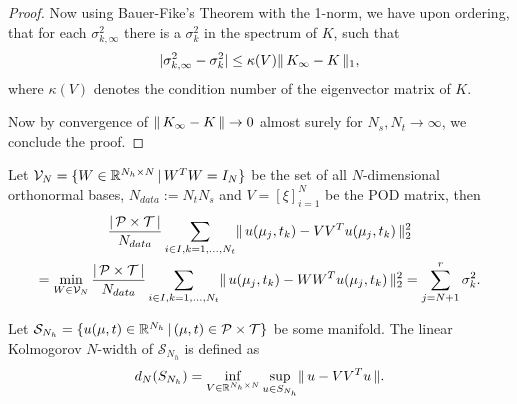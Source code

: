 \begin{proof}
    
    Now using Bauer-Fike's Theorem with the 1-norm, we have upon ordering, that for each $\sigma^2_{k,\infty}$ there is a $\sigma^2_k$ in the spectrum of $K$, such that
    \begin{equation*}
        \vert \sigma_{k, \infty}^2 - \sigma_k^2  \vert \leq \kappa(V) \lVert \, K_\infty - K \, \rVert_1,
    \end{equation*}
    where $\kappa(V)$ denotes the condition number of the eigenvector matrix of $K$. 
    
    
    Now by convergence of $\lVert \, K_\infty - K \, \rVert \to 0$ almost surely for $N_s, N_t \to \infty$, we conclude the proof. 
\end{proof}

\begin{proposition} \label{prop: eigenvalues and optimal projection under sampling}
    Let $\mathcal{V}_N = \{ W \in \mathbb{R}^{N_h \times N} \, \vert \, W^T W = I_N \}$ be the set of all $N$-dimensional orthonormal bases, 
    $N_{data} := N_t N_s$ and $V = [\xi]_{i=1}^N$ be the POD matrix, then
    \begin{multline*}
        \frac{\vert \, \mathcal{P} \times \mathcal{T} \, \vert}{N_{data}} 
        \sum\limits_{i \in I, k = 1, \dots, N_t} \lVert \, u(\mu_j, t_k) - V V^T u(\mu_j, t_k) \, \rVert_2^2 \\
        = \min\limits_{W \in \mathcal{V}_N} \frac{\vert \, \mathcal{P} \times \mathcal{T} \, \vert}{N_{data}} 
        \sum\limits_{i \in I, k = 1, \dots, N_t} 
        \lVert \, u(\mu_j, t_k) - W W^T u(\mu_j, t_k) \, \rVert_2^2 
        = \sum_{j=N+1}^r \sigma_k^2.
    \end{multline*}
\end{proposition}

\begin{definition} \label{def: linear kolmogorov}
    Let $\mathcal{S}_{N_h} = \{ u(\mu, t) \in \mathbb{R}^{N_h} \, \vert \, (\mu, t) \in \mathcal{P} \times \mathcal{T} \}$ be some manifold. The linear Kolmogorov $N$-width of $\mathcal{S}_{N_h}$ is defined as
    \begin{equation*}
        d_N(S_{N_h}) = \inf\limits_{V \in \mathbb{R}^{N_h \times N}} \sup\limits_{u \in S_{N_h}} \lVert \, u - V V^T u \, \rVert.
    \end{equation*}
\end{definition}

